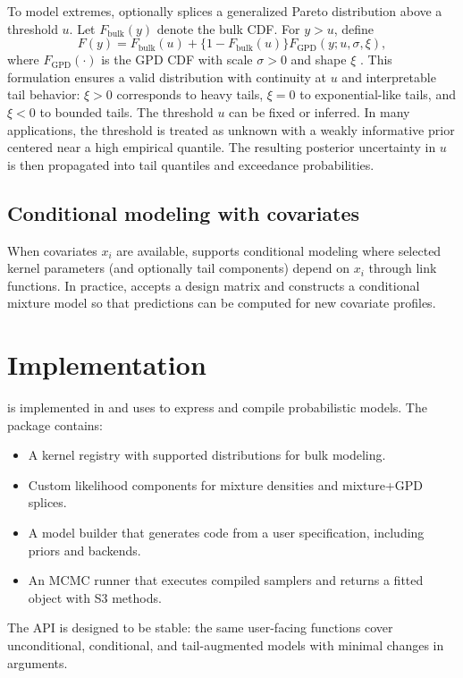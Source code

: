 \documentclass[article]{jss}\usepackage[]{graphicx}\usepackage[]{xcolor}
\begin{document}
To model extremes,  optionally splices a generalized Pareto distribution above a threshold $u$.
Let $F_{\text{bulk}}(y)$ denote the bulk CDF.
For $y>u$, define
\[
F(y) = F_{\text{bulk}}(u) + \{1-F_{\text{bulk}}(u)\} F_{\text{GPD}}(y;u,\sigma,\xi),
\]
where $F_{\text{GPD}}(\cdot)$ is the GPD CDF with scale $\sigma>0$ and shape $\xi$ \citep{Pickands1975, DeHaanFerreira2006}.
This formulation ensures a valid distribution with continuity at $u$ and interpretable tail behavior:
$\xi>0$ corresponds to heavy tails, $\xi=0$ to exponential-like tails, and $\xi<0$ to bounded tails.
The threshold $u$ can be fixed or inferred.
In many applications, the threshold is treated as unknown with a weakly informative prior centered near a high empirical quantile.
The resulting posterior uncertainty in $u$ is then propagated into tail quantiles and exceedance probabilities.

\subsection{Conditional modeling with covariates}

When covariates $x_i$ are available,  supports conditional modeling where selected kernel parameters (and optionally tail components) depend on $x_i$ through link functions.
In practice,  accepts a design matrix  and constructs a conditional mixture model so that predictions can be computed for new covariate profiles.

\section{Implementation}

 is implemented in  and uses  to express and compile probabilistic models.
The package contains:
\begin{itemize}
  \item A kernel registry with supported distributions for bulk modeling.
  \item Custom likelihood components for mixture densities and mixture+GPD splices.
  \item A model builder that generates  code from a user specification, including priors and backends.
  \item An MCMC runner that executes compiled samplers and returns a fitted object with S3 methods.
\end{itemize}
The API is designed to be stable: the same user-facing functions cover unconditional, conditional, and tail-augmented models with minimal changes in arguments.
\end{document}
